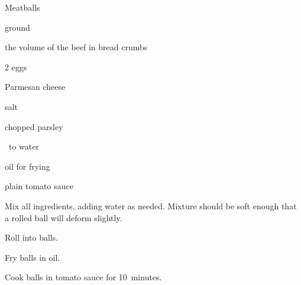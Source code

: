 \begin{recipe}{Meatballs}{}{}

\begin{ingredients}
\item {} ground 
\item \half the volume of the beef in bread crumbs
\item 2 eggs
\item {} Parmesan cheese
\item salt
\item chopped parsley
\item \quarter\ to \C{\half} water
\item oil for frying
\item plain tomato sauce
\end{ingredients}

\begin{directions}
\item Mix all ingredients, adding water as needed. Mixture should be soft enough that a rolled ball will deform slightly.
\item Roll into balls.
\item Fry balls in oil.
\item Cook balls in tomato sauce for 10~minutes.
\end{directions}

\end{recipe}
